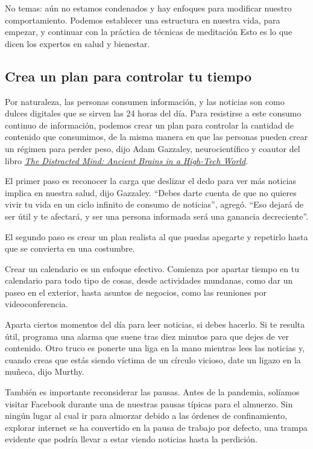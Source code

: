 No temas: aún no estamos condenados y hay enfoques para modificar
nuestro comportamiento. Podemos establecer una estructura en nuestra
vida, para empezar, y continuar con la práctica de técnicas de
meditación Esto es lo que dicen los expertos en salud y bienestar.

\hypertarget{crea-un-plan-para-controlar-tu-tiempo}{%
\subsection{Crea un plan para controlar tu
tiempo}\label{crea-un-plan-para-controlar-tu-tiempo}}

Por naturaleza, las personas consumen información, y las noticias son
como dulces digitales que se sirven las 24 horas del día. Para
resistirse a este consumo continuo de información, podemos crear un plan
para controlar la cantidad de contenido que consumimos, de la misma
manera en que las personas pueden crear un régimen para perder peso,
dijo Adam Gazzaley, neurocientífico y coautor del libro
\href{https://mitpress.mit.edu/books/distracted-mind}{\emph{The
Distracted Mind: Ancient Brains in a High-Tech World}}.

El primer paso es reconocer la carga que deslizar el dedo para ver más
noticias implica en nuestra salud, dijo Gazzaley. ``Debes darte cuenta
de que no quieres vivir tu vida en un ciclo infinito de consumo de
noticias'', agregó. ``Eso dejará de ser útil y te afectará, y ser una
persona informada será una ganancia decreciente''.

El segundo paso es crear un plan realista al que puedas apegarte y
repetirlo hasta que se convierta en una costumbre.

Crear un calendario es un enfoque efectivo. Comienza por apartar tiempo
en tu calendario para todo tipo de cosas, desde actividades mundanas,
como dar un paseo en el exterior, hasta asuntos de negocios, como las
reuniones por videoconferencia.

Aparta ciertos momentos del día para leer noticias, si debes hacerlo. Si
te resulta útil, programa una alarma que suene tras diez minutos para
que dejes de ver contenido. Otro truco es ponerte una liga en la mano
mientras lees las noticias y, cuando creas que estás siendo víctima de
un círculo vicioso, date un ligazo en la muñeca, dijo Murthy.

También es importante reconsiderar las pausas. Antes de la pandemia,
solíamos visitar Facebook durante una de nuestras pausas típicas para el
almuerzo. Sin ningún lugar al cual ir para almorzar debido a las órdenes
de confinamiento, explorar internet se ha convertido en la pausa de
trabajo por defecto, una trampa evidente que podría llevar a estar
viendo noticias hasta la perdición.


